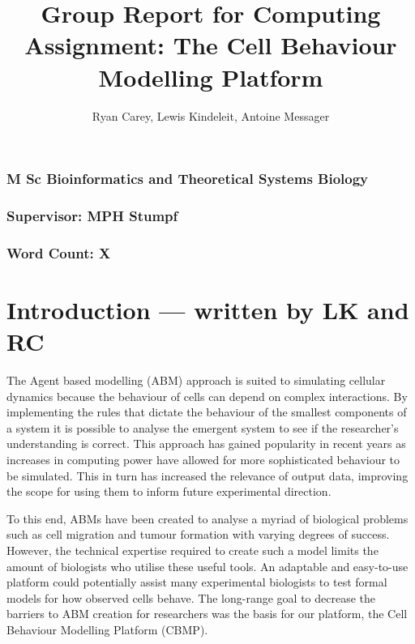 \documentclass[12pt]{article}
\title{Group Report for Computing Assignment: The Cell Behaviour Modelling Platform}
\author{Ryan Carey, Lewis Kindeleit, Antoine Messager}
\begin{document}
\maketitle
{\centering
\subsubsection*{M Sc Bioinformatics and Theoretical Systems Biology}
\subsubsection*{Supervisor: MPH Stumpf} 
\subsubsection*{Word Count: X}
}

\newpage
\tableofcontents
\newpage
\section{Introduction --- written by LK and RC} 
The Agent based modelling (ABM) approach is suited to simulating cellular dynamics because the behaviour of cells can 
depend on complex interactions.\cite{kaul15} By implementing the rules 
that dictate the behaviour of the smallest components of a system it is possible to analyse the emergent 
system to see if the researcher’s understanding is correct. This approach has gained popularity in recent 
years as increases in computing power have allowed for more sophisticated behaviour to be simulated. 
This in turn has increased the relevance of output data, improving the scope for using them to inform 
future experimental direction. \cite{grimm06} \cite{drasdo07}

To this end, ABMs have been created to analyse a myriad of biological problems such as cell migration 
and tumour formation with varying degrees of success. However, the technical expertise required to 
create such a model limits the amount of biologists who utilise these useful tools. An adaptable and 
easy-to-use platform could potentially assist many experimental biologists to test formal models for 
how observed cells behave. The long-range goal to decrease the barriers to  ABM creation for researchers 
was the basis for our platform, the Cell Behaviour Modelling Platform (CBMP).
\end{document}
